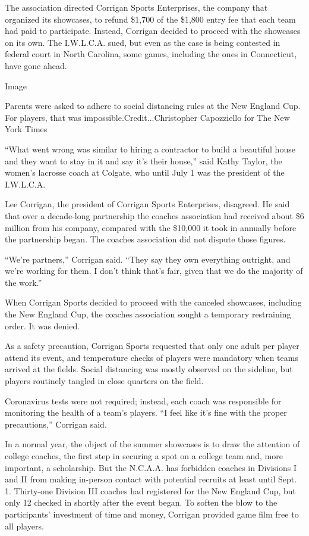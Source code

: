 The association directed Corrigan Sports Enterprises, the company that
organized its showcases, to refund \$1,700 of the \$1,800 entry fee that
each team had paid to participate. Instead, Corrigan decided to proceed
with the showcases on its own. The I.W.L.C.A. sued, but even as the case
is being contested in federal court in North Carolina, some games,
including the ones in Connecticut, have gone ahead.

Image

Parents were asked to adhere to social distancing rules at the New
England Cup. For players, that was impossible.Credit...Christopher
Capozziello for The New York Times

``What went wrong was similar to hiring a contractor to build a
beautiful house and they want to stay in it and say it's their house,''
said Kathy Taylor, the women's lacrosse coach at Colgate, who until July
1 was the president of the I.W.L.C.A.

Lee Corrigan, the president of Corrigan Sports Enterprises, disagreed.
He said that over a decade-long partnership the coaches association had
received about \$6 million from his company, compared with the \$10,000
it took in annually before the partnership began. The coaches
association did not dispute those figures.

``We're partners,'' Corrigan said. ``They say they own everything
outright, and we're working for them. I don't think that's fair, given
that we do the majority of the work.''

When Corrigan Sports decided to proceed with the canceled showcases,
including the New England Cup, the coaches association sought a
temporary restraining order. It was denied.

As a safety precaution, Corrigan Sports requested that only one adult
per player attend its event, and temperature checks of players were
mandatory when teams arrived at the fields. Social distancing was mostly
observed on the sideline, but players routinely tangled in close
quarters on the field.

Coronavirus tests were not required; instead, each coach was responsible
for monitoring the health of a team's players. ``I feel like it's fine
with the proper precautions,'' Corrigan said.

In a normal year, the object of the summer showcases is to draw the
attention of college coaches, the first step in securing a spot on a
college team and, more important, a scholarship. But the N.C.A.A. has
forbidden coaches in Divisions I and II from making in-person contact
with potential recruits at least until Sept. 1. Thirty-one Division III
coaches had registered for the New England Cup, but only 12 checked in
shortly after the event began. To soften the blow to the participants'
investment of time and money, Corrigan provided game film free to all
players.

